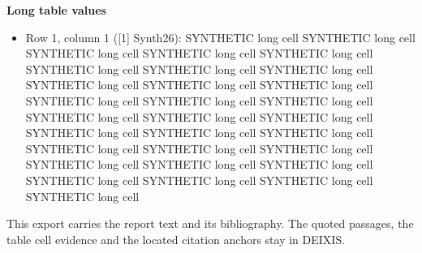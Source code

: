 \documentclass[journal]{IEEEtran}
\begin{document}
\noindent\textbf{Long table values}

\begin{itemize}
\item[1.] Row 1, column 1 ([1] Synth26): SYNTHETIC long cell SYNTHETIC long cell SYNTHETIC long cell SYNTHETIC long cell SYNTHETIC long cell SYNTHETIC long cell SYNTHETIC long cell SYNTHETIC long cell SYNTHETIC long cell SYNTHETIC long cell SYNTHETIC long cell SYNTHETIC long cell SYNTHETIC long cell SYNTHETIC long cell SYNTHETIC long cell SYNTHETIC long cell SYNTHETIC long cell SYNTHETIC long cell SYNTHETIC long cell SYNTHETIC long cell SYNTHETIC long cell SYNTHETIC long cell SYNTHETIC long cell SYNTHETIC long cell SYNTHETIC long cell SYNTHETIC long cell SYNTHETIC long cell SYNTHETIC long cell SYNTHETIC long cell SYNTHETIC long cell
\end{itemize}

This export carries the report text and its bibliography. The quoted passages, the table cell evidence and the located citation anchors stay in DEIXIS.




\end{document}
